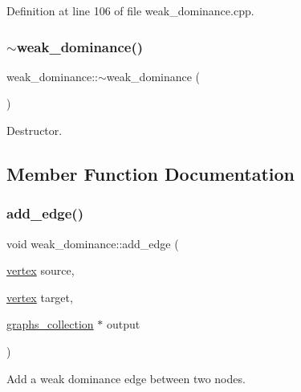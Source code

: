 Definition at line 106 of file weak\+\_\+dominance.\+cpp.

\mbox{\label{classweak__dominance_a7d24d930610c420aef3eaf1f69a5ee5c}} 
\subsubsection{\texorpdfstring{$\sim$weak\+\_\+dominance()}{~weak\_dominance()}}
{\footnotesize\ttfamily weak\+\_\+dominance\+::$\sim$weak\+\_\+dominance (\begin{DoxyParamCaption}{ }\end{DoxyParamCaption})\hspace{0.3cm}{\ttfamily [default]}}



Destructor. 



\subsection{Member Function Documentation}
\mbox{\label{classweak__dominance_a64ede646c8dfba6460ac1042bb7e5aa0}} 
\subsubsection{\texorpdfstring{add\+\_\+edge()}{add\_edge()}}
{\footnotesize\ttfamily void weak\+\_\+dominance\+::add\+\_\+edge (\begin{DoxyParamCaption}\item[{\hyperlink{graph_8hpp_abefdcf0544e601805af44eca032cca14}{vertex}}]{source,  }\item[{\hyperlink{graph_8hpp_abefdcf0544e601805af44eca032cca14}{vertex}}]{target,  }\item[{\hyperlink{structgraphs__collection}{graphs\+\_\+collection} $\ast$}]{output }\end{DoxyParamCaption})\hspace{0.3cm}{\ttfamily [private]}}



Add a weak dominance edge between two nodes. 


